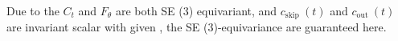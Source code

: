 \documentclass{article} %
\begin{document}
Due to the $C_t$ and $F_\theta$ are both SE (3) equivariant, and $c_{\text {skip }}(t)$ and $c_{\text {out }}(t)$ are invariant scalar with given , the SE (3)-equivariance are guaranteed here. 
\begin{comment}
\IncMargin{1em}
\begin{algorithm}
	\SetKwData{Left}{left}\SetKwData{This}{this}\SetKwData{Up}{up}
	\SetKwFunction{Union}{Union}\SetKwFunction{FindCompress}{FindCompress}
	\SetKwInOut{Input}{input}\SetKwInOut{Output}{output}
	\Input{ dataset $\mathcal{D}=\left\{G_i, C_i\right\}_{i \in M}$, where $M$  refer to the conformation number in $\mathcal{D}$, initial model parameter $\boldsymbol{\theta}$, learning
		rate $\eta$, step schedule $N(\cdot)$, EMA decay rate schedule 
		$\mu(\cdot)$,
		$\boldsymbol{\theta}^{-} \leftarrow \boldsymbol{\theta}$ and $k \leftarrow 0$;\newline
	}
	
	
	\BlankLine
	\Repeat { \bf{convergence}}
	{\ \ 
		\bf{Sample} $\quad G, C \sim \mathcal{D}$, and $n \sim \mathcal{U}[1, N(k)-1]$ ;\newline
		\bf{Sample} $\quad \mathbf{z} \sim \mathcal{N}(\mathbf{0}, \boldsymbol{I})$ ;\newline
		$\mathcal{L}\left(\boldsymbol{\theta}, \boldsymbol{\theta^{-}}\right) \leftarrow MSE \left(f_{\boldsymbol{\theta}}\left(C+t_{n+1} \cdot z, t_{n+1} \mid G\right), f_{\boldsymbol{\theta^{-}}}\left(C+t_n \cdot z, t_n \mid G\right)\right)$ ;\newline
		$\boldsymbol{\theta} \leftarrow \boldsymbol{\theta}-\eta \nabla_{\boldsymbol{\theta}} \mathcal{L}\left(\boldsymbol{\theta}, \boldsymbol{\theta}^{-}\right)$ ;\newline
		$\boldsymbol{\theta^{-}} \leftarrow \mu(k) \boldsymbol{\theta^{-}}+(1-\mu(k)) \boldsymbol{\theta}$ ;\newline
		$k \leftarrow k+1$ ;\newline}
	
	
	\caption{Equivariant Consistency Training}
	\label{algorithm2}
\end{algorithm}
\DecMargin{1em}
\end{comment}
\end{document}
